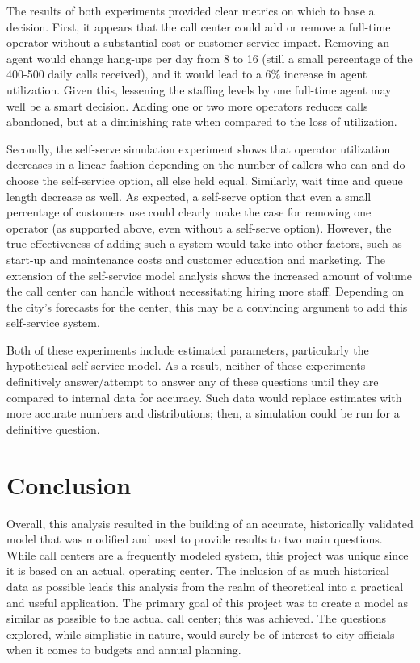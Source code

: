 \documentclass[12pt]{article}
\begin{document}
The results of both experiments provided clear metrics on which to base a decision.  First, it appears that the call center could add or remove a full-time operator without a substantial cost or customer service impact.  Removing an agent would change hang-ups per day from 8 to 16 (still a small percentage of the 400-500 daily calls received), and it would lead to a 6\% increase in agent utilization.  Given this, lessening the staffing levels by one full-time agent may well be a smart decision.  Adding one or two more operators reduces calls abandoned, but at a diminishing rate when compared to the loss of utilization.

\par

Secondly, the self-serve simulation experiment shows that operator utilization decreases in a linear fashion depending on the number of callers who can and do choose the self-service option, all else held equal.  Similarly, wait time and queue length decrease as well.  As expected, a self-serve option that even a small percentage of customers use could clearly make the case for removing one operator (as supported above, even without a self-serve option).  However, the true effectiveness of adding such a system would take into other factors, such as start-up and maintenance costs and customer education and marketing.  The extension of the self-service model analysis shows the increased amount of volume the call center can handle without necessitating hiring more staff.  Depending on the city's forecasts for the center, this may be a convincing argument to add this self-service system.

\par

Both of these experiments include estimated parameters, particularly the hypothetical self-service model.  As a result, neither of these experiments definitively answer/attempt to answer any of these questions until they are compared to internal data for accuracy.  Such data would replace estimates with more accurate numbers and distributions; then, a simulation could be run for a definitive question.


\section{Conclusion}

Overall, this analysis resulted in the building of an accurate, historically validated model that was modified and used to provide results to two main questions.  While call centers are a frequently modeled system, this project was unique since it is based on an actual, operating center.  The inclusion of as much historical data as possible leads this analysis from the realm of theoretical into a practical and useful application.  The primary goal of this project was to create a model as similar as possible to the actual call center; this was achieved.  The questions explored, while simplistic in nature, would surely be of interest to city officials when it comes to budgets and annual planning.
\end{document}
